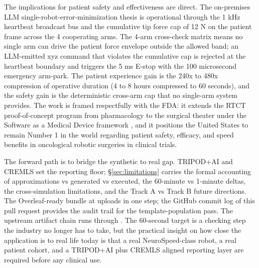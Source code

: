 The implications for patient safety and effectiveness are direct.
The on-premises LLM single-robot-error-minimization thesis is
operational through the 1 kHz heartbeat broadcast bus
\cite{iec-80601-2-77, iec-62304} and the cumulative tip force cap
of 12 N on the patient frame across the 4 cooperating arms. The
4-arm cross-check matrix means no single arm can drive the patient
force envelope outside the allowed band; an LLM-emitted xyz command
that violates the cumulative cap is rejected at the heartbeat
boundary and triggers the 5 ms E-stop with the 100 microsecond
emergency arm-park. The patient experience gain is the 240x to 480x
compression of operative duration (4 to 8 hours compressed to 60
seconds), and the safety gain is the deterministic cross-arm cap
that no single-arm system provides. The work is framed respectfully
with the FDA: it extends the RTCT proof-of-concept program from
pharmacology to the surgical theater under the Software as a Medical
Device framework \cite{fda-samd}, and it positions the United States
to remain Number 1 in the world regarding patient safety, efficacy,
and speed benefits in oncological robotic surgeries in clinical
trials.

The forward path is to bridge the synthetic to real gap. TRIPOD+AI
and CREMLS \cite{Collins2024TRIPODAI, ElEmam2024CREMLS} set the
reporting floor; \S\ref{sec:limitations} carries the formal
accounting of approximations vs generated vs executed, the 60-minute
vs 1-minute deltas, the cross-simulation limitations, and the
Track A vs Track B future directions. The Overleaf-ready bundle at
uploads in one step; the GitHub commit log of this pull request
provides the audit trail for the template-population pass. The
upstream artifact chain runs through
\cite{kawchak_2026_20113157, repo-robotic-surgeries,
kawchak_2026_19994945, kawchak_2025_17774560,
kawchak_2025_15549831, kawchak_2025_17614396}. The 60-second target
is a checking step the industry no longer has to take, but the
practical insight on how close the application is to real life
today is that a real NeuroSpeed-class robot, a real patient cohort,
and a TRIPOD+AI plus CREMLS aligned reporting layer are required
before any clinical use.
